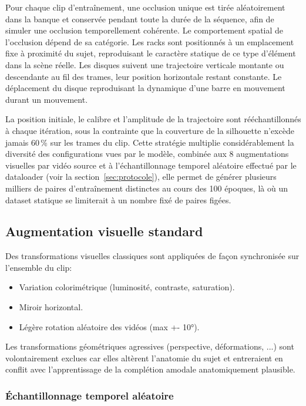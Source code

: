 Pour chaque clip d'entraînement, une occlusion unique est tirée aléatoirement dans la banque et conservée pendant toute la durée de la séquence, afin de simuler une occlusion temporellement cohérente. Le comportement spatial de l'occlusion dépend de sa catégorie. Les racks sont positionnés à un emplacement fixe à proximité du sujet, reproduisant le caractère statique de ce type d'élément dans la scène réelle. Les disques suivent une trajectoire verticale montante ou descendante au fil des trames, leur position horizontale restant constante. Le déplacement du disque reproduisant la dynamique d'une barre en mouvement durant un mouvement.

La position initiale, le calibre et l'amplitude de la trajectoire sont rééchantillonnés à chaque itération, sous la contrainte que la couverture de la silhouette n'excède jamais 60\,\% sur les trames du clip. Cette stratégie multiplie considérablement la diversité des configurations vues par le modèle, combinée aux 8 augmentations visuelles par vidéo source et à l'échantillonnage temporel aléatoire effectué par le dataloader (voir la section~\ref{sec:protocole}), elle permet de générer plusieurs milliers de paires d'entraînement distinctes au cours des 100 époques, là où un dataset statique se limiterait à un nombre fixé de paires figées.

\subsection{Augmentation visuelle standard}

Des transformations visuelles classiques sont appliquées de façon synchronisée sur l'ensemble du clip:

\begin{itemize}
  \item Variation colorimétrique (luminosité, contraste, saturation).
  \item Miroir horizontal.
  \item Légère rotation aléatoire des vidéos (max +- 10°).
\end{itemize}

Les transformations géométriques agressives (perspective, déformations, ...) sont volontairement exclues car elles altèrent l'anatomie du sujet et entreraient en conflit avec l'apprentissage de la complétion amodale anatomiquement plausible.

\subsubsection{Échantillonnage temporel aléatoire}

